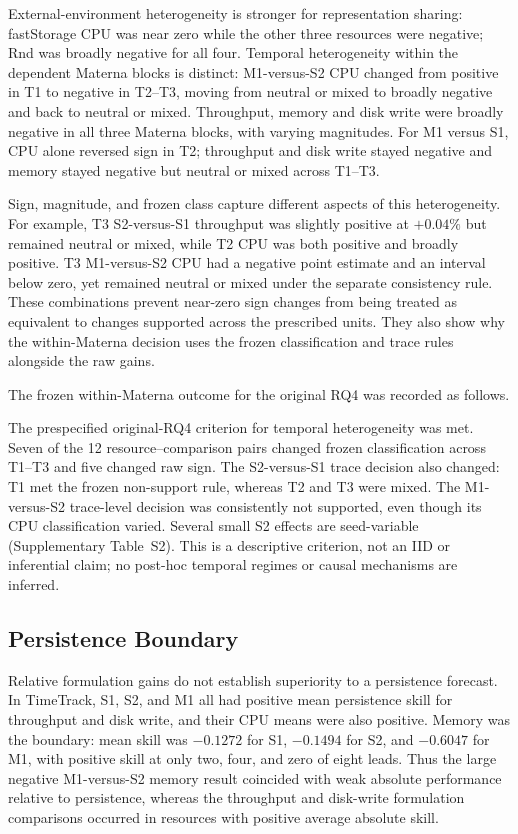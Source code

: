 \documentclass[a4paper,fleqn]{cas-dc}
\begin{document}
External-environment heterogeneity is stronger for representation sharing: fastStorage
CPU was near zero while the other three resources were negative; Rnd was
broadly negative for all four. Temporal heterogeneity within the dependent
Materna blocks is distinct: M1-versus-S2 CPU changed from positive in T1 to
negative in T2--T3, moving from neutral or mixed to broadly negative and back
to neutral or mixed. Throughput, memory and disk write were broadly negative
in all three Materna blocks, with varying magnitudes. For M1 versus S1, CPU
alone reversed sign in T2; throughput and disk write stayed negative and
memory stayed negative but neutral or mixed across T1--T3.

Sign, magnitude, and frozen class capture different aspects of this
heterogeneity. For example, T3 S2-versus-S1 throughput was slightly positive at
$+0.04\%$ but remained neutral or mixed, while T2 CPU was both positive and
broadly positive. T3 M1-versus-S2 CPU had a negative point estimate and an
interval below zero, yet remained neutral or mixed under the separate
consistency rule. These combinations prevent near-zero sign changes from being
treated as equivalent to changes supported across the prescribed units. They
also show why the within-Materna decision uses the frozen classification and
trace rules alongside the raw gains.

The frozen within-Materna outcome for the original RQ4 was recorded as
follows.

\noindent The prespecified original-RQ4 criterion for temporal heterogeneity was met.
Seven of the 12
resource--comparison pairs changed frozen classification across T1--T3 and
five changed raw sign. The S2-versus-S1 trace decision also changed: T1 met the
frozen non-support rule, whereas T2 and T3 were mixed. The M1-versus-S2
trace-level decision was consistently not supported, even though its CPU
classification varied. Several small S2 effects are seed-variable
(Supplementary Table~S2). This is a descriptive criterion, not an IID or
inferential claim; no post-hoc temporal regimes or causal mechanisms are
inferred.

\subsection{Persistence Boundary}
\label{sec:results-persistence}

Relative formulation gains do not establish superiority to a persistence
forecast. In TimeTrack, S1, S2, and M1 all had positive mean persistence skill
for throughput and disk write, and their CPU means were also positive. Memory
was the boundary: mean skill was $-0.1272$ for S1, $-0.1494$ for S2, and
$-0.6047$ for M1, with positive skill at only two, four, and zero of eight
leads. Thus the large negative M1-versus-S2 memory result coincided with weak
absolute performance relative to persistence, whereas the throughput and
disk-write formulation comparisons occurred in resources with positive
average absolute skill.
\end{document}
